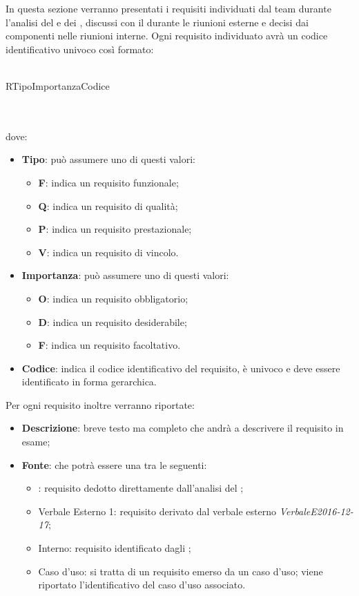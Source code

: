 In questa sezione verranno presentati i requisiti individuati dal team durante l'analisi del 
e dei , discussi con il  durante le riunioni esterne e decisi dai componenti
nelle riunioni interne.
Ogni requisito individuato avrà un codice identificativo univoco così formato: \\ \\
\centerline{R\textbraceleft{}Tipo\textbraceright{}\textbraceleft{}Importanza\textbraceright{}\textbraceleft{}Codice\textbraceright{}}
 \\ \\
dove:
\begin{itemize}
 	\item \textbf{Tipo}: può assumere uno di questi valori:
 	\begin{itemize}
 		\item \textbf{F}: indica un requisito funzionale;
 		\item \textbf{Q}: indica un requisito di qualità;
 		\item \textbf{P}: indica un requisito prestazionale;
 		\item \textbf{V}: indica un requisito di vincolo.
 	\end{itemize}
 	\item \textbf{Importanza}: può assumere uno di questi valori:
 	\begin{itemize}
 		\item \textbf{O}: indica un requisito obbligatorio;
 		\item \textbf{D}: indica un requisito desiderabile;
 		\item \textbf{F}: indica un requisito facoltativo.
 	\end{itemize}
 	\item \textbf{Codice}: indica il codice identificativo del requisito, è univoco e deve essere identificato in forma gerarchica.
 \end{itemize}
Per ogni requisito inoltre verranno riportate:
\begin{itemize}
	\item \textbf{Descrizione}: breve testo ma completo che andrà a descrivere il requisito in esame;
	\item \textbf{Fonte}: che potrà essere una tra le seguenti:
	\begin{itemize}
		\item {}: requisito dedotto direttamente dall'analisi del ;
		\item Verbale Esterno 1: requisito derivato dal verbale esterno \textit{Verbale\textunderscore{}E\textunderscore{}2016-12-17};
		\item Interno: requisito identificato dagli \ANP;
		\item Caso d'uso: si tratta di un requisito emerso da un caso d'uso; viene riportato l'identificativo del caso d'uso associato.
	\end{itemize}
\end{itemize}
